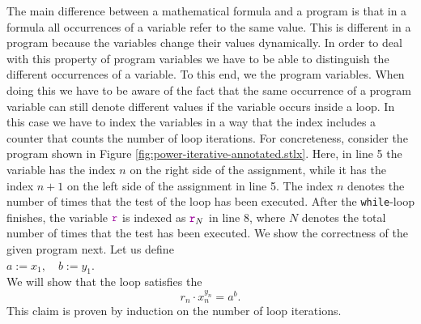 The main difference between a mathematical formula and a program is that in a formula all
occurrences of a variable refer to the same value.   This is different in a program because the
variables change their values dynamically.  In order to deal with this property of program variables
we have to be able to distinguish the different occurrences of a variable.  To this end,  we 
 the program variables. 
When doing this we have to be aware of the fact that the same occurrence of a program variable can
still denote different values if the variable occurs inside  a loop.  In this case we have to index
the variables in a way that the index includes a counter that counts the number of loop iterations.
For concreteness, consider the  program shown in 
Figure \ref{fig:power-iterative-annotated.stlx}.  
Here, in line 5 the variable  has the index $n$ on the right side of the assignment,
while it has the index $n+1$ on the left side of the assignment in line 5.  The index $n$ denotes 
the number of times that the test  of the  loop has been executed.
After the \texttt{while}-loop finishes, the variable $\mytt{r}$ is indexed as
$\mytt{r}_N$ in line 8, where $N$ denotes the total number of times that the test  has been executed.
We show the correctness of the given program next.  Let us define
\\[0.2cm]
\hspace*{1.3cm}
$ a := x_1, \quad b := y_1$.
\\[0.2cm]
We will show that the  loop satisfies the 
\begin{equation}
  \label{eq:powerInv}
   r_n \cdot x_n^{y_n} = a^b.
\end{equation}
This claim is proven by induction on the number of loop iterations.
